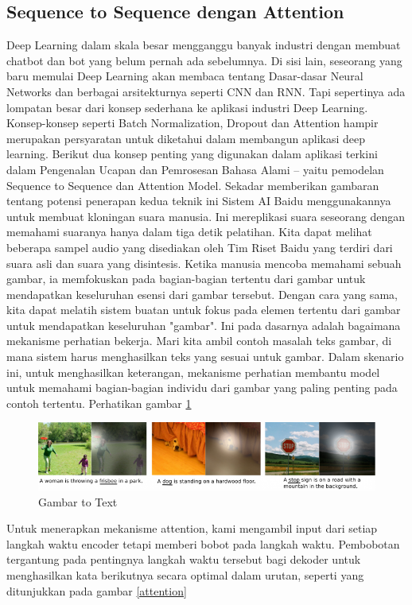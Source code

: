 \subsection{Sequence to Sequence dengan Attention}
Deep Learning dalam skala besar mengganggu banyak industri dengan membuat chatbot dan bot yang belum pernah ada sebelumnya. Di sisi lain, seseorang yang baru memulai Deep Learning akan membaca tentang Dasar-dasar Neural Networks dan berbagai arsitekturnya seperti CNN dan RNN. Tapi sepertinya ada lompatan besar dari konsep sederhana ke aplikasi industri Deep Learning. Konsep-konsep seperti Batch Normalization, Dropout dan Attention hampir merupakan persyaratan untuk diketahui dalam membangun aplikasi deep learning. Berikut dua konsep penting yang digunakan dalam aplikasi terkini dalam Pengenalan Ucapan dan Pemrosesan Bahasa Alami – yaitu pemodelan Sequence to Sequence dan Attention Model. Sekadar memberikan gambaran tentang potensi penerapan kedua teknik ini Sistem AI Baidu menggunakannya untuk membuat kloningan suara manusia. Ini mereplikasi suara seseorang dengan memahami suaranya hanya dalam tiga detik pelatihan. Kita dapat melihat beberapa  sampel audio yang  disediakan oleh Tim Riset Baidu yang terdiri dari suara asli dan suara yang disintesis. Ketika manusia mencoba memahami sebuah gambar, ia memfokuskan pada bagian-bagian tertentu dari gambar untuk mendapatkan keseluruhan esensi dari gambar tersebut. Dengan cara yang sama, kita dapat melatih sistem buatan untuk fokus pada elemen tertentu dari gambar untuk mendapatkan keseluruhan "gambar". Ini pada dasarnya adalah bagaimana mekanisme perhatian bekerja. Mari kita ambil contoh masalah teks gambar, di mana sistem harus menghasilkan teks yang sesuai untuk gambar. Dalam skenario ini, untuk menghasilkan keterangan, mekanisme perhatian membantu model untuk memahami bagian-bagian individu dari gambar yang paling penting pada contoh tertentu. Perhatikan gambar \ref{gambar} 

\begin{figure}[H]
        \centerline{\includegraphics[scale=.5]{figures/gambar3}}
        \caption{Gambar to Text}
		\label{gambar}
\end{figure}

Untuk menerapkan mekanisme attention, kami mengambil input dari setiap langkah waktu encoder tetapi memberi bobot pada langkah waktu. Pembobotan tergantung pada pentingnya langkah waktu tersebut bagi dekoder untuk menghasilkan kata berikutnya secara optimal dalam urutan, seperti yang ditunjukkan pada gambar \ref{attention}

